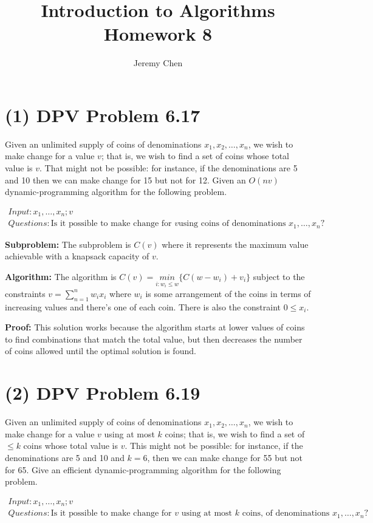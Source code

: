 \documentclass[10pt,letterpaper]{article}
\title{Introduction to Algorithms Homework 8}
\author{Jeremy Chen}
\begin{document}
	\maketitle
\section*{(1) DPV Problem 6.17}
\noindent Given an unlimited supply of coins of denominations $x_{1}, x_{2}, \dots, x_{n}$, we wish to make change for a value $v$; that is, we wish to find a set of coins whose total value is $v$. That might not be possible: for instance, if the denominations are 5 and 10 then we can make change for 15 but not for 12. Given an $O(nv)$ dynamic-programming algorithm for the following problem.

$\begin{array}{lr}
Input: x_{1}, \dots, x_{n}; v \\
Questions: \text{Is it possible to make change for } v \text{using coins of denominations } x_{1}, \dots, x_{n}?
\end{array}$

\textbf{Subproblem: }The subproblem is $C(v)$ where it represents the maximum value achievable with a knapsack capacity of $v$.

\textbf{Algorithm: }The algorithm is $C(v) = \underset{i: w_{i} \leq w}{min}\{ C(w - w_{i}) + v_{i} \}$ subject to the constraints $v = \sum_{n = 1}^{n} w_{i}x_{i}$
where $w_{i}$ is some arrangement of the coins in terms of increasing values and there's one of each coin. There is also the constraint $0 \leq x_{i}$. 

\textbf{Proof: } This solution works because the algorithm starts at lower values of coins to find combinations that match the total value, but then decreases the number of coins allowed until the optimal solution is found. 

\section*{(2) DPV Problem 6.19}
Given an unlimited supply of coins of denominations $x_{1}, x_{2}, \dots, x_{n}$, we wish to make change for a value $v$ using at most $k$ coins; that is, we wish to find a set of $\leq k$ coins whose total value is $v$. This might not be possible: for instance, if the denominations are 5 and 10 and $k = 6$, then we can make change for 55 but not for 65. Give an efficient dynamic-programming algorithm for the following problem.

$\begin{array}{lr}
Input: x_{1}, \dots, x_{n}; v \\
Questions: \text{Is it possible to make change for } v \text{ using at most } k \text{ coins, of denominations } x_{1}, \dots, x_{n}?
\end{array}$
\end{document}
